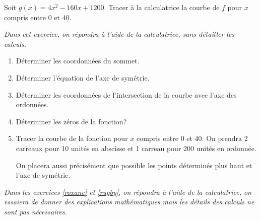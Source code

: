 \begin{exo}
Soit $g(x)=4x^2-160x+1200$. Tracer à la calculatrice la courbe de $f$ pour $x$ compris entre $0$ et $40$. 

{\it Dans cet exercice, on répondra à l'aide de la calculatrice, sans détailler les calculs.}


\begin{enumerate}
\item Déterminer  les coordonnées du sommet.

\item Déterminer l'équation de l'axe de symétrie.

\item Déterminer les coordonnées de l'intersection de la courbe avec l'axe des ordonnées.

\item Déterminer les zéros de la fonction?

\item Tracer la courbe de la fonction pour $x$ compris entre 0 et 40. On prendra 2 carreaux pour 10 unités en abscisse et 1 carreau pour 200 unités en ordonnée. 

On placera aussi précisément que possible les points déterminés plus haut et l'axe de symétrie.
\end{enumerate}


%
%

\end{exo}





{\it Dans les exercices \ref{roxane} et \ref{rugby}, on répondra à l'aide de la calculatrice, on essaiera de donner des explications mathématiques mais les détails des  calculs ne sont pas nécessaires.}	


